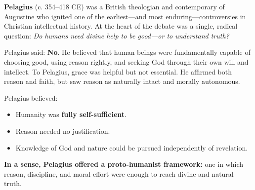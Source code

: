 \begin{tcolorbox}[
  colback=gray!5,
  colframe=black,
  title=\textbf{Historical Sidebar: Augustine’s Breakup with Manichaeism},
  fonttitle=\bfseries,
  width=\linewidth,
  enlarge left by=0mm,
  enlarge right by=0mm,
  boxrule=0.4pt,
  arc=2mm,
  left=4pt,
  right=4pt,
  top=6pt,
  bottom=6pt
]
  
  \textbf{Pelagius} (c. 354–418 CE) was a British theologian and contemporary of Augustine who ignited one of the earliest—and most enduring—controversies in Christian intellectual history. At the heart of the debate was a single, radical question: \textit{Do humans need divine help to be good—or to understand truth?}
  
  \medskip
  
  Pelagius said: \textbf{No}. He believed that human beings were fundamentally capable of choosing good, using reason rightly, and seeking God through their own will and intellect. To Pelagius, grace was helpful but not essential. He affirmed both reason and faith, but saw reason as naturally intact and morally autonomous.
  
  \medskip
  Pelagius believed:

  \medskip

  \begin{itemize}
    \item Humanity was \textbf{fully self-sufficient}.
    \item Reason needed no justification.
    \item Knowledge of God and nature could be pursued independently of revelation.
  \end{itemize}

  \medskip
  
  \textbf{In a sense, Pelagius offered a proto-humanist framework:} one in which reason, discipline, and moral effort were enough to reach divine and natural truth.
  
  \end{tcolorbox}

